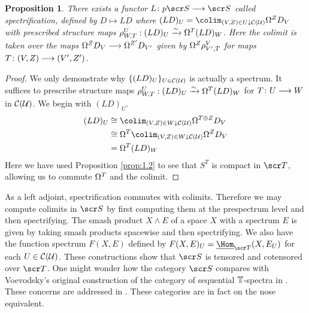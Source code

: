 \documentclass{amsart}
\newtheorem{prop}[thm]{Proposition}
\theoremstyle{definition}
\begin{document}
\begin{prop}\label{prop:2.1}
There exists a functor $L \colon p \sS \rtarr \sS$ called spectrification, defined by $D \mapsto LD$ where $(LD)_U = \colim_{(V,Z) \in U \downarrow \oC(\oU)} \OM^Z D_V$ with prescribed structure maps $\rho^{U}_{W,T} : (LD)_U \xrightarrow{\sim} \Omega^T (LD)_W$. Here the colimit is taken over the maps $\Omega^Z D_V \longrightarrow \Omega^{Z'}D_{V'}$ given by $\Omega^{Z}\rho^{V}_{V', T}$ for maps $T \colon (V,Z) \longrightarrow (V',Z')$. 
\end{prop}

\begin{proof}
We only demonstrate why $\{(LD)_U\}_{U \in {\mathcal{C}}({\mathcal{U}})}$ is actually a spectrum. It suffices to prescribe structure maps $\rho^{U}_{W,T} : (LD)_U \xrightarrow{\sim} \Omega^T (LD)_W$ for $T \colon U \longrightarrow W$ in ${\mathcal{C}}({\mathcal{U}})$. We begin with $(LD)_U$. 
\begin{equation*}
\begin{split}
(LD)_U 
&\iso \colim_{(V,Z) \in W \downarrow \oC(\oU)} \OM^{T \oplus Z} D_V\\
&\iso \OM^T \colim_{(V,Z) \in W \downarrow \oC(\oU)} \OM^Z D_V\\
&= \OM^T(LD)_W
\end{split}
\end{equation*}
Here we have used Proposition \ref{prop:1.2} to see that $S^T$ is compact in $\sT$, allowing us to commute $\Omega^T$ and the colimit. 
\end{proof}

As a left adjoint, spectrification commutes with colimits. Therefore we may compute colimits in $\sS$ by first computing them at the prespectrum level and then spectrifying. The smash product $X \wedge E$ of a space $X$ with a spectrum $E$ is given by taking smash products spacewise and then spectrifying. We also have the function spectrum $F(X,E)$ defined by $F(X,E)_U = \underline{\Hom}_{\sT} (X,E_U)$ for each $U \in {\mathcal{C}}({\mathcal{U}})$. These constructions show that $\sS$ is tensored and cotensored over $\sT$. One might wonder how the category $\sS$ compares with Voevodsky's original construction of the category of sequential $\mathbb{T}$-spectra in \cite{voev96pre}. These concerns are addressed in \cite[Proposition 3.4 and Theorem 4.5]{Hu03}. These categories are in fact on the nose equivalent.
\end{document}
